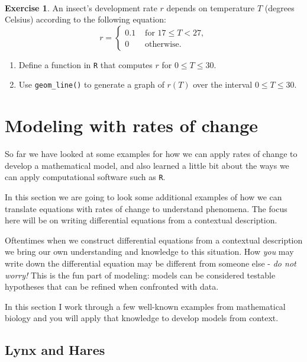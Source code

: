 \documentclass[
]{book}
\theoremstyle{definition}
\theoremstyle{definition}
\theoremstyle{definition}
\newtheorem{exercise}{Exercise}[chapter]
\theoremstyle{remark}
\begin{document}
~
\begin{exercise}
\protect\hypertarget{exr:unnamed-chunk-51}{}{\label{exr:unnamed-chunk-51} }An insect's development rate \(r\) depends on temperature \(T\) (degrees Celsius) according to the following equation:
\begin{equation}
r =
\begin{cases}
0.1 & \text{ for } 17 \leq T < 27,\\
0 &\text{ otherwise.}
\end{cases}
\end{equation}

\begin{enumerate}[label=\alph*.]
\item Define a function in \texttt{R} that computes $r$ for $0 \leq T \leq 30$.
\item Use \texttt{geom\_line()} to generate a graph of $r(T)$ over the interval $0 \leq T \leq 30$.
\end{enumerate}
\end{exercise}

\hypertarget{modeling-rates-03}{%
\chapter{Modeling with rates of change}\label{modeling-rates-03}}

So far we have looked at some examples for how we can apply rates of change to develop a mathematical model, and also learned a little bit about the ways we can apply computational software such as \texttt{R}.

In this section we are going to look some additional examples of how we can translate equations with rates of change to understand phenomena. The focus here will be on writing differential equations from a contextual description.

Oftentimes when we construct differential equations from a contextual description we bring our own understanding and knowledge to this situation. How \emph{you} may write down the differential equation may be different from someone else - \emph{do not worry!} This is the fun part of modeling: models can be considered testable hypotheses that can be refined when confronted with data.

In this section I work through a few well-known examples from mathematical biology and you will apply that knowledge to develop models from context.

\hypertarget{lynx-and-hares}{%
\section{Lynx and Hares}\label{lynx-and-hares}}
\end{document}
